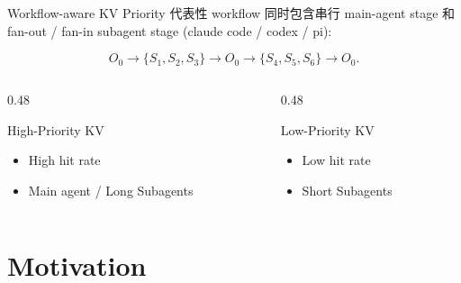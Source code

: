 \documentclass[aspectratio=43]{beamer}
\begin{document}
\begin{frame}{Workflow-aware KV Priority}
  \small
  代表性 workflow 同时包含串行 main-agent stage 和 fan-out / fan-in subagent stage (claude code / codex / pi):

  \vspace{0.15cm}
  \[
    O_0 \rightarrow \{S_1,S_2,S_3\} \rightarrow O_0
    \rightarrow \{S_4,S_5,S_6\} \rightarrow O_0 .
  \]

  \vspace{0.10cm}
  \begin{columns}[T,onlytextwidth]
    \begin{column}{0.48\textwidth}
      \begin{block}{High-Priority KV}
        \begin{itemize}
          \item High hit rate
          \item Main agent / Long Subagents
        \end{itemize}
      \end{block}
    \end{column}
    \begin{column}{0.48\textwidth}
      \begin{block}{Low-Priority KV}
        \begin{itemize}
          \item Low hit rate
          \item Short Subagents
        \end{itemize}
      \end{block}
    \end{column}
  \end{columns}

  \vspace{0.12cm}
  \footnotesize
\end{frame}

\section{Motivation}
\end{document}
